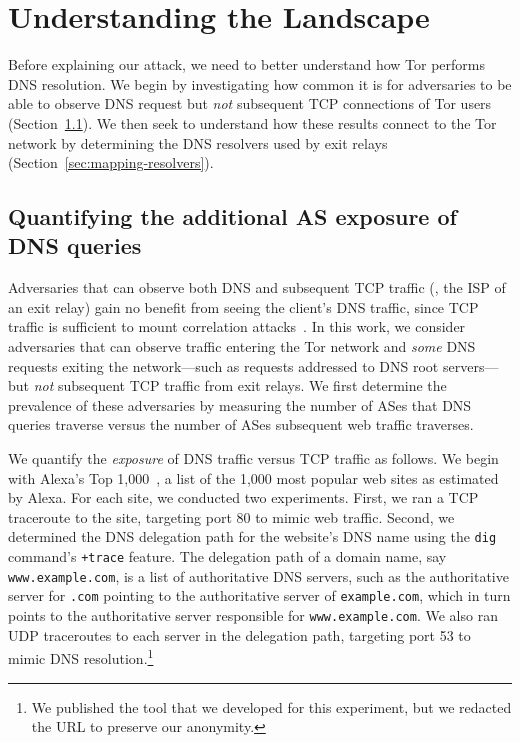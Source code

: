 \section{Understanding the Landscape}
\label{sec:landscape}

Before explaining our attack, we need to better understand how Tor performs DNS
resolution.  We begin by investigating how common it is for adversaries
to be able to observe DNS request but \emph{not} subsequent TCP connections of
Tor users (Section~\ref{sec:as-exposure}).  We then seek to understand how
these results connect to the Tor network by determining the DNS resolvers used
by exit relays (Section~\ref{sec:mapping-resolvers}).

\subsection{Quantifying the additional AS exposure of DNS queries}
\label{sec:as-exposure}

Adversaries that can observe both DNS and subsequent TCP traffic (\eg, the ISP
of an exit relay) gain no benefit from seeing the client's DNS traffic,
since TCP traffic is sufficient to mount correlation
attacks~\cite{Murdoch2007a}.  In this work, we consider
adversaries that can observe traffic entering the Tor network and \emph{some}
DNS requests exiting the network---such as requests addressed to DNS
root servers---but {\em not} subsequent TCP traffic from exit relays.
We first determine the prevalence of these adversaries by measuring the
number of ASes that DNS queries traverse versus the
number of ASes subsequent web traffic traverses.

We quantify the {\em exposure} of DNS traffic versus TCP traffic as follows.  We
begin with Alexa's Top 1,000~\cite{alexatop1k}, a list of the 1,000 most popular
web sites as estimated by Alexa.  For each site, we conducted two
experiments.  First, we ran a TCP traceroute to the site, targeting port 80 to
mimic web traffic.  Second, we determined the DNS delegation path for the
website's DNS name using the {\tt dig} command's \texttt{+trace} feature.  The
delegation path of a domain name, say {\tt www.example.com}, is a list of
authoritative DNS servers, such as the authoritative server for {\tt .com}
pointing to the authoritative server of {\tt example.com}, which in turn points
to the authoritative server responsible for {\tt www.example.com}.  We also ran
UDP traceroutes to each server in the delegation path, targeting port 53 to
mimic DNS resolution.\footnote{We published the tool that we developed for this
experiment, but we redacted the URL to preserve our anonymity.}

